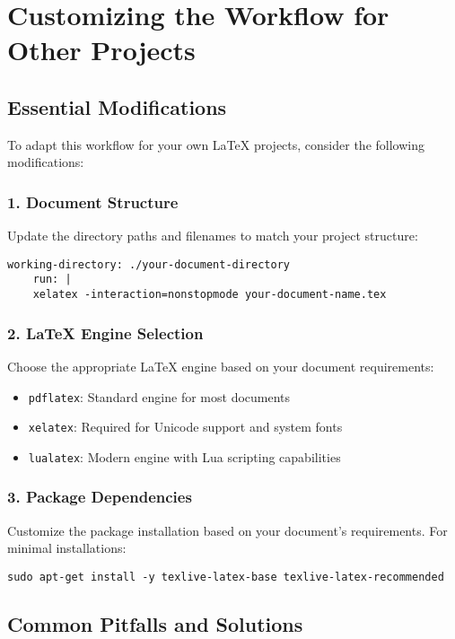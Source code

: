 \section{Customizing the Workflow for Other Projects}
\label{sec:adaptation}

\subsection{Essential Modifications}

To adapt this workflow for your own LaTeX projects, consider the following modifications:

\subsubsection{1. Document Structure}
Update the directory paths and filenames to match your project structure:
\begin{lstlisting}[breaklines=true]
	working-directory: ./your-document-directory
	run: |
	xelatex -interaction=nonstopmode your-document-name.tex
\end{lstlisting}

\subsubsection{2. LaTeX Engine Selection}
Choose the appropriate LaTeX engine based on your document requirements:
\begin{itemize}
	\item \texttt{pdflatex}: Standard engine for most documents
	\item \texttt{xelatex}: Required for Unicode support and system fonts
	\item \texttt{lualatex}: Modern engine with Lua scripting capabilities
\end{itemize}

\subsubsection{3. Package Dependencies}
Customize the package installation based on your document's requirements. For minimal installations:
\begin{lstlisting}[breaklines=true]
sudo apt-get install -y texlive-latex-base texlive-latex-recommended
\end{lstlisting}

\subsection{Common Pitfalls and Solutions}

